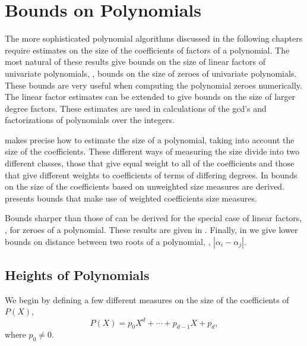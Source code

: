 \chapter{Bounds on Polynomials}
\label{PBounds:Chap}


The more sophisticated polynomial algorithms discussed in the following 
chapters require
estimates on the size of the coefficients of factors of a polynomial.
The most natural of these results give bounds on the size of linear
factors of univariate polynomials, \ie, bounds on the size of zeroes
of univariate polynomials.  These bounds are very useful when
computing the polynomial zeroes numerically.  The linear factor
estimates can be extended to give bounds on the size of larger degree
factors.  These estimates are
used in calculations of the {\sc gcd}'s and factorizations of polynomials
over the integers.

 makes precise how to estimate the size of a
polynomial, taking into account the size of the coefficients.  These
different ways of measuring the size divide into two different
classes, those that give equal weight to all of the coefficients and
those that give different weights to coefficients of terms of
differing degrees.  In  bounds
on the size of the coefficients based on unweighted size
measures are derived.   presents bounds that
make use of weighted coefficients size measures.  

Bounds sharper than those of  can be
derived for the special case of linear factors, \ie, for zeroes of a
polynomial.  These results are given in .
Finally, in  we give lower bounds on
distance between two roots of a polynomial, \ie, $|\alpha_i - \alpha_j|$.

\section{Heights of Polynomials}
\label{PB:Heights:Sec}

We begin by defining a few different measures on the size of the
coefficients of $P(X)$, 
\begin{equation}\label{PA:p:Def:Eq}
P(X) = p_0 X^d + \cdots + p_{d-1} X + p_d,
\end{equation}
where $p_0 \not= 0$.

